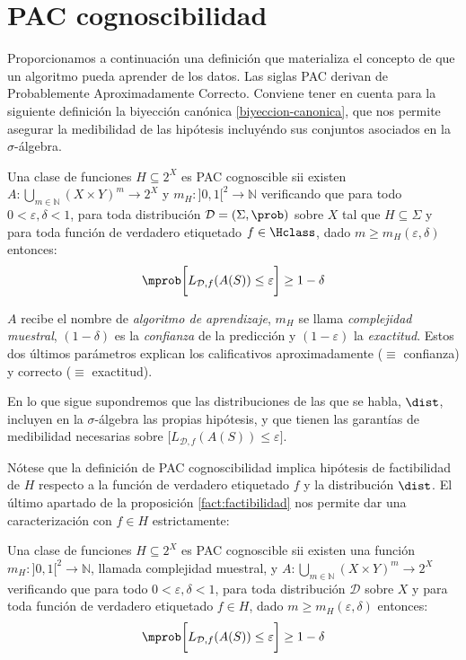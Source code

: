 \section{PAC cognoscibilidad}
Proporcionamos a continuación una definición que materializa el concepto de que un algoritmo pueda aprender de los datos. Las
siglas PAC derivan de Probablemente Aproximadamente Correcto. Conviene tener en cuenta para la siguiente definición la
biyección canónica \ref{biyeccion-canonica}, que nos permite asegurar la medibilidad de las hipótesis incluyéndo sus conjuntos
asociados en la $\sigma$-álgebra.

\begin{definition}
Una clase de funciones $H \subseteq 2^X$ es PAC cognoscible sii existen $A: \underset{m\in \mathbb{N}}{\bigcup} (X\times Y)^m \rightarrow 2^X$ 
y $m_{H} : ]0,1[^2\rightarrow \mathbb{N}$ verificando que para todo
$0 < \varepsilon, \delta < 1$, para toda distribución $\mathcal{D}=(\Sigma, \prob)$ sobre $X$ tal que $H\subseteq \Sigma$
y para toda función de verdadero etiquetado $f\in \Hclass$, dado $m \ge m_H(\varepsilon, \delta)$ entonces:
\[
  \mprob \bigg[L_{\mathcal{D},f}(A(S)) \le \varepsilon \bigg] \ge 1-\delta
\]
\label{def:pac-original}
\end{definition}

$A$ recibe el nombre de \textit{algoritmo de aprendizaje}, $m_H$ se llama \textit{complejidad muestral}, $(1-\delta)$ es la 
\textit{confianza} de la predicción y $(1-\varepsilon)$ la \textit{exactitud}. Estos dos últimos parámetros explican los 
calificativos aproximadamente ($\equiv$ confianza) y correcto ($\equiv$ exactitud).

En lo que sigue supondremos que las distribuciones de las que se habla, $\dist$, incluyen en la $\sigma$-álgebra las propias
hipótesis, y que tienen las garantías de medibilidad necesarias sobre $\bigg[L_{\mathcal{D},f}(A(S)) \le \varepsilon \bigg]$.

Nótese que la definición de PAC cognoscibilidad implica hipótesis de factibilidad de $H$ respecto a la función de verdadero
etiquetado $f$ y la distribución $\dist$. El último apartado de la proposición \ref{fact:factibilidad} 
nos permite dar una caracterización con $f\in H$ estrictamente:

\begin{charact}
Una clase de funciones $H \subseteq 2^X$ es PAC cognoscible sii existen una función 
$m_{H} : ]0,1[^2\rightarrow \mathbb{N}$, llamada complejidad muestral, y 
$A: \underset{m\in \mathbb{N}}{\bigcup} (X\times Y)^m \rightarrow 2^X$ verificando que para todo
$0 < \varepsilon, \delta < 1$, para toda distribución $\mathcal{D}$ sobre $X$ y para toda función de 
verdadero etiquetado $f\in H$, dado $m \ge m_H(\varepsilon, \delta)$ entonces:
\[
  \mprob \bigg[L_{\mathcal{D},f}(A(S)) \le \varepsilon \bigg] \ge 1-\delta
\]
\label{def:pac}
\end{charact}

